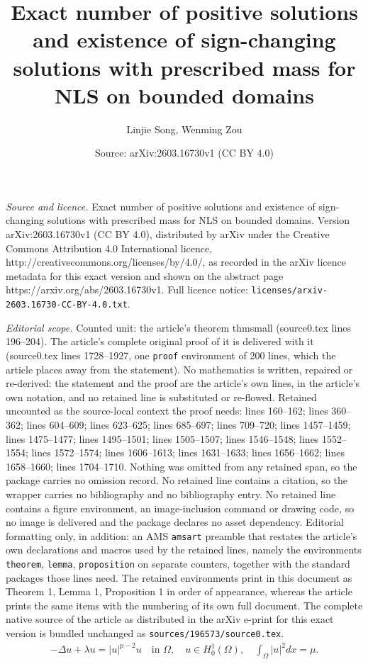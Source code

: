 \documentclass[10pt,a4paper]{amsart}
\title{Exact number of positive solutions and existence of sign-changing solutions with prescribed mass for NLS on bounded domains}
\author{Linjie Song, Wenming Zou}
\date{Source: arXiv:2603.16730v1 (CC BY 4.0)}
\newcommand{\la}{\lambda}
\begin{document}
\maketitle

\noindent\emph{Source and licence.} Exact number of positive solutions and existence of sign-changing solutions with prescribed mass for NLS on bounded domains. Version arXiv:2603.16730v1 (CC BY 4.0), distributed by arXiv under the Creative Commons Attribution 4.0 International licence, http://creativecommons.org/licenses/by/4.0/, as recorded in the arXiv licence metadata for this exact version and shown on the abstract page https://arxiv.org/abs/2603.16730v1. Full licence notice: \texttt{licenses/arxiv-2603.16730-CC-BY-4.0.txt}.\par\smallskip

\noindent\textit{Editorial scope.} Counted unit: the article's theorem thmsmall (source0.tex lines 196--204). The article's complete original proof of it is delivered with it (source0.tex lines 1728--1927, one \texttt{proof} environment of 200 lines, which the article places away from the statement). No mathematics is written, repaired or re-derived: the statement and the proof are the article's own lines, in the article's own notation, and no retained line is substituted or re-flowed.  Retained uncounted as the source-local context the proof needs: lines 160--162; lines 360--362; lines 604--609; lines 623--625; lines 685--697; lines 709--720; lines 1457--1459; lines 1475--1477; lines 1495--1501; lines 1505--1507; lines 1546--1548; lines 1552--1554; lines 1572--1574; lines 1606--1613; lines 1631--1633; lines 1656--1662; lines 1658--1660; lines 1704--1710.  Nothing was omitted from any retained span, so the package carries no omission record.  No retained line contains a citation, so the wrapper carries no bibliography and no bibliography entry.  No retained line contains a figure environment, an image-inclusion command or drawing code, so no image is delivered and the package declares no asset dependency.  Editorial formatting only, in addition: an AMS \texttt{amsart} preamble that restates the article's own declarations and macros used by the retained lines, namely the environments \texttt{theorem}, \texttt{lemma}, \texttt{proposition} on separate counters, together with the standard packages those lines need.  The retained environments print in this document as Theorem 1, Lemma 1, Proposition 1 in order of appearance, whereas the article prints the same items with the numbering of its own full document.  The complete native source of the article as distributed in the arXiv e-print for this exact version is bundled unchanged as \texttt{sources/196573/source0.tex}.
	\begin{align} \label{eqonbounddomain}
		-\Delta u + \la u = |u|^{p-2}u \quad \text{in } \Omega, \quad u \in H_0^1(\Omega), \quad \int_{\Omega}|u|^2dx = \mu.
	\end{align}
\end{document}
